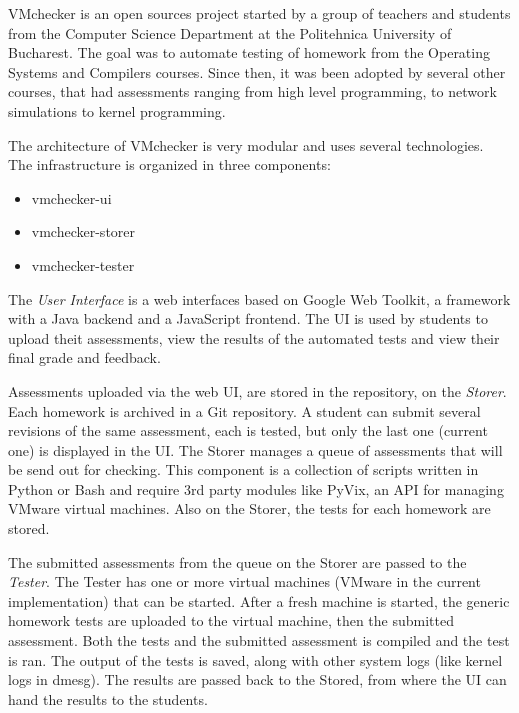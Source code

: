 
VMchecker is an open sources project started by a group of teachers and
students from the Computer Science Department at the Politehnica University
of Bucharest. The goal was to automate testing of homework from the
Operating Systems and Compilers courses. Since then, it was been adopted by
several other courses, that had assessments ranging from high level
programming, to network simulations to kernel programming.

The architecture of VMchecker is very modular and uses several
technologies. The infrastructure is organized in three components:
\begin{itemize}
\item vmchecker-ui
\item vmchecker-storer
\item vmchecker-tester
\end{itemize}

The \emph{User Interface} is a web interfaces based on Google Web Toolkit,
a framework with a Java backend and a JavaScript frontend. The UI is used
by students to upload theit assessments, view the results of the automated
tests and view their final grade and feedback.

Assessments uploaded via the web UI, are stored in the repository, on the
\emph{Storer}. Each homework is archived in a Git repository. A student can
submit several revisions of the same assessment, each is tested, but only
the last one (current one) is displayed in the UI. The Storer manages a
queue of assessments that will be send out for checking. This component is
a collection of scripts written in Python or Bash and require 3rd party
modules like PyVix, an API for managing VMware virtual machines. Also on
the Storer, the tests for each homework are stored.

The submitted assessments from the queue on the Storer are passed to the
\emph{Tester}. The Tester has one or more virtual machines (VMware in the
current implementation) that can be started. After a fresh machine is
started, the generic homework tests are uploaded to the virtual machine,
then the submitted assessment. Both the tests and the submitted assessment
is compiled and the test is ran. The output of the tests is saved, along
with other system logs (like kernel logs in dmesg). The results are passed
back to the Stored, from where the UI can hand the results to the students.




